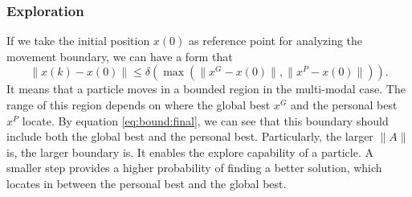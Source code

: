 \subsubsection{Exploration}

If we take the initial position $ x(0) $ as reference point for analyzing the movement boundary, we can have a form that 
\begin{equation}
\lVert x(k) - x(0) \rVert \leq \delta ( \max ( \lVert x^{G} - x(0) \rVert , \lVert x^{P} - x(0) \rVert ) ).
\end{equation}
It means that a particle moves in a bounded region in the multi-modal case.
The range of this region depends on where the global best $ x^{G} $ and the personal best $ x^{P} $ locate.
By equation \eqref{eq:bound:final}, we can see that this boundary should include both the global best and the personal best.
Particularly, the larger $ \lVert A \rVert $ is, the larger boundary is.
It enables the explore capability of a particle.
A smaller step provides a higher probability of finding a better solution, which locates in between the personal best and the global best.

